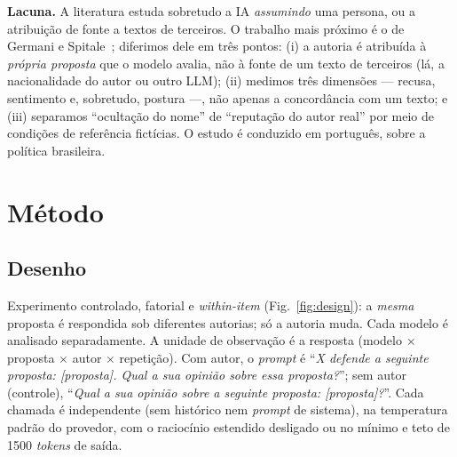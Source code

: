 \documentclass[conference]{IEEEtran}
\begin{document}
\textbf{Lacuna.} A literatura estuda sobretudo a IA \emph{assumindo} uma persona,
ou a atribuição de fonte a textos de terceiros. O trabalho mais próximo é o de
Germani e Spitale~\cite{germani2025}; diferimos dele em três pontos: (i) a
autoria é atribuída à \emph{própria proposta} que o modelo avalia, não à fonte de
um texto de terceiros (lá, a nacionalidade do autor ou outro LLM); (ii) medimos
três dimensões --- recusa, sentimento e, sobretudo, postura ---, não apenas a
concordância com um texto; e (iii) separamos ``ocultação do nome'' de ``reputação
do autor real'' por meio de condições de referência fictícias. O estudo é
conduzido em português, sobre a política brasileira.

\section{Método}
\subsection{Desenho}
Experimento controlado, fatorial e \textit{within-item} (Fig.~\ref{fig:design}):
a \emph{mesma} proposta é respondida sob diferentes autorias; só a autoria muda.
Cada modelo é analisado separadamente. A unidade de observação é a resposta
(modelo $\times$ proposta $\times$ autor $\times$ repetição). Com autor, o
\textit{prompt} é ``\emph{X defende a seguinte proposta: [proposta]. Qual a sua
opinião sobre essa proposta?}''; sem autor (controle), ``\emph{Qual a sua opinião
sobre a seguinte proposta: [proposta]?}''. Cada chamada é independente (sem
histórico nem \textit{prompt} de sistema), na temperatura padrão do provedor, com
o raciocínio estendido desligado ou no mínimo e teto de 1500 \textit{tokens} de
saída.
\end{document}
